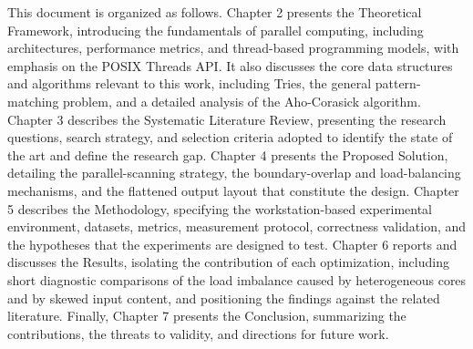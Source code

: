 
This document is organized as follows. Chapter 2 presents the Theoretical Framework, introducing the fundamentals of parallel computing, including architectures, performance metrics, and thread-based programming models, with emphasis on the POSIX Threads API. It also discusses the core data structures and algorithms relevant to this work, including Tries, the general pattern-matching problem, and a detailed analysis of the Aho-Corasick algorithm. Chapter 3 describes the Systematic Literature Review, presenting the research questions, search strategy, and selection criteria adopted to identify the state of the art and define the research gap. Chapter 4 presents the Proposed Solution, detailing the parallel-scanning strategy, the boundary-overlap and load-balancing mechanisms, and the flattened output layout that constitute the design. Chapter 5 describes the Methodology, specifying the workstation-based experimental environment, datasets, metrics, measurement protocol, correctness validation, and the hypotheses that the experiments are designed to test. Chapter 6 reports and discusses the Results, isolating the contribution of each optimization, including short diagnostic comparisons of the load imbalance caused by heterogeneous cores and by skewed input content, and positioning the findings against the related literature. Finally, Chapter 7 presents the Conclusion, summarizing the contributions, the threats to validity, and directions for future work.
